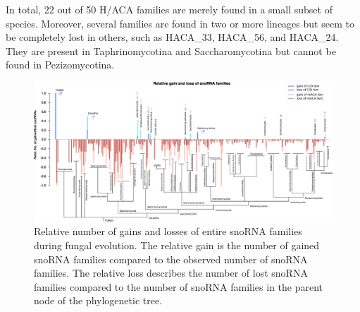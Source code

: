 In total, 22 out of 50 H/ACA families are merely found in a
small subset of species. Moreover, several families are found in two
or more lineages but seem to be completely lost in others, such as HACA\_33,
HACA\_56, and HACA\_24. They are present in Taphrinomycotina and
Saccharomycotina but cannot be found in Pezizomycotina. 


\begin{figure}
  \centering
  \includegraphics[width=\textwidth]{pics/fungi_relative_gain_loss.eps}
  \caption{Relative number of gains and losses of entire snoRNA families during fungal
evolution. The relative gain is the number of gained snoRNA families compared to the
observed number of snoRNA families. The relative loss describes the number of lost
snoRNA families compared to the number of snoRNA families in the parent node of the
phylogenetic tree.}
\label{fig:relative_innovation_deletion_events}
\end{figure}



